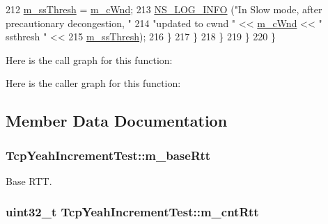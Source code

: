 \begin{DoxyCode}
212                   \hyperlink{classTcpYeahIncrementTest_a8e3638319f857c50fceeb89c2c6cdabf}{m\_ssThresh} = \hyperlink{classTcpYeahIncrementTest_a3661dc763cb1315b447146422578f251}{m\_cWnd};
213                   \hyperlink{group__logging_gafbd73ee2cf9f26b319f49086d8e860fb}{NS\_LOG\_INFO} (\textcolor{stringliteral}{"In Slow mode, after precautionary decongestion, "}
214                                \textcolor{stringliteral}{"updated to cwnd "} << \hyperlink{classTcpYeahIncrementTest_a3661dc763cb1315b447146422578f251}{m\_cWnd} << \textcolor{stringliteral}{" ssthresh "} <<
215                                \hyperlink{classTcpYeahIncrementTest_a8e3638319f857c50fceeb89c2c6cdabf}{m\_ssThresh});
216                 \}
217             \}
218         \}
219     \}
220 \}
\end{DoxyCode}


Here is the call graph for this function\+:




Here is the caller graph for this function\+:




\subsection{Member Data Documentation}
\subsubsection[{\texorpdfstring{m\+\_\+base\+Rtt}{m_baseRtt}}]{ Tcp\+Yeah\+Increment\+Test\+::m\+\_\+base\+Rtt\hspace{0.3cm}{\ttfamily [private]}}\hypertarget{classTcpYeahIncrementTest_a5fba73c69f81dc327c87218ba1bff4b6}{}\label{classTcpYeahIncrementTest_a5fba73c69f81dc327c87218ba1bff4b6}


Base R\+TT. 

\subsubsection[{\texorpdfstring{m\+\_\+cnt\+Rtt}{m_cntRtt}}]{\setlength{\rightskip}{0pt plus 5cm}uint32\+\_\+t Tcp\+Yeah\+Increment\+Test\+::m\+\_\+cnt\+Rtt\hspace{0.3cm}{\ttfamily [private]}}\hypertarget{classTcpYeahIncrementTest_ae374626ccd1961d37291bf1dd066833a}{}\label{classTcpYeahIncrementTest_ae374626ccd1961d37291bf1dd066833a}


